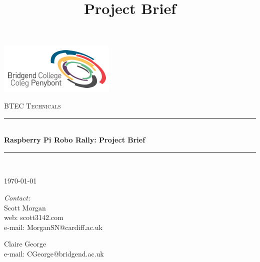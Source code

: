 \documentclass[10pt]{article}
\title{Project Brief}
\begin{document}
	\begin{center}																		%
		\newcommand{\HRule}{\rule{\linewidth}{0.5mm}}									%
			\begin{flushright}
				\includegraphics[scale = 1]{bcoll.png}
		\end{flushright}
		
		\vspace*{3cm}								%
		\textsc{\huge BTEC Technicals}\\[1.5cm]
		
		\vspace{3cm}											%
		\HRule \\[0.4cm]																	%
		{ \huge \bfseries Raspberry Pi Robo Rally: Project Brief}\\[0.4cm]	%
		\HRule \\[1.5cm]																	%
		
		\vspace{2cm} 																				
		\begin{center}																					
			{\large \today}																	%
		\end{center}												  						
	\end{center}	
	\vspace*{3cm}																			
	
	\begin{minipage}{0.52\textwidth}													%
		\begin{flushleft} \large															%
			\emph{Contact: %
			}\\	
			Scott Morgan\\
			web: scott3142.com\\
			e-mail: MorganSN@cardiff.ac.uk\\
		\end{flushleft}																		%
	\end{minipage}
	\begin{minipage}{0.46\textwidth}	
		\begin{flushright} \large															%
			Claire George\\
			e-mail: CGeorge@bridgend.ac.uk\\
		\end{flushright}																		%
	\end{minipage}
	
\end{document}
